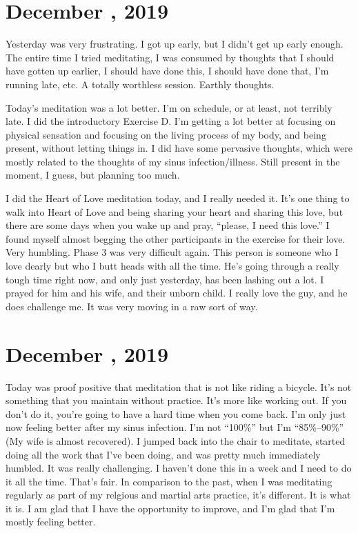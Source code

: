 \documentclass[b6paper]{article}
\begin{document}
\pagebreak

\section*{December , 2019}

Yesterday was very frustrating. I got up early, but I didn't get up early enough. The entire time I tried meditating, I was consumed by thoughts that I should have gotten up earlier, I should have done this, I should have done that, I'm running late, etc. A totally worthless session. Earthly thoughts.

Today's meditation was a lot better. I'm on schedule, or at least, not terribly late. I did the introductory Exercise D. I'm getting a lot better at focusing on physical sensation and focusing on the living process of my body, and being present, without letting things in. I did have some pervasive thoughts, which were mostly related to the thoughts of my sinus infection/illness. Still present in the moment, I guess, but planning too much.

I did the Heart of Love meditation today, and I really needed it. It's one thing to walk into Heart of Love and being sharing your heart and sharing this love, but there are some days when you wake up and pray, ``please, I need this love.'' I found myself almost begging the other participants in the exercise for their love. Very humbling. Phase 3 was very difficult again. This person is someone who I love dearly but who I butt heads with all the time. He's going through a really tough time right now, and only just yesterday, has been lashing out a lot. I prayed for him and his wife, and their unborn child. I really love the guy, and he does challenge me. It was very moving in a raw sort of way.

\pagebreak
\section*{December , 2019}

Today was proof positive that meditation that is not like riding a bicycle. It's not something that you maintain without practice. It's more like working out. If you don't do it, you're going to have a hard time when you come back. I'm only just now feeling better after my sinus infection. I'm not ``100\%'' but I'm ``85\%--90\%'' (My wife is almost recovered). I jumped back into the chair to meditate, started doing all the work that I've been doing, and was pretty much immediately humbled. It was really challenging. I haven't done this in a week and I need to do it all the time. That's fair. In comparison to the past, when I was meditating regularly as part of my relgious and martial arts practice, it's different. It is what it is. I am glad that I have the opportunity to improve, and I'm glad that I'm mostly feeling better.
\end{document}
